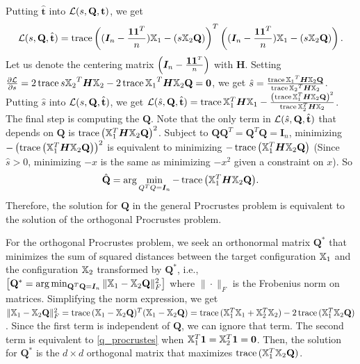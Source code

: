 \documentclass[12pt,oneside,final]{thesis}
\begin{document}
Putting $\hat{\mathbf{t}}$ into  $\mathcal{L}(s,\mathbf{Q},{\mathbf{t}})$, we get 
\[\mathcal{L}(s,\mathbf{Q},\hat{\mathbf{t}}) = \operatorname{trace} \left((\bm{I}_n- \frac{\mbox{{\bf 1}} {\ensuremath{\mbox{{\bf 1}}}} ^T}{n}){\mathbb{X}}_1 - (s{\mathbb{X}}_2\mathbf{Q} )\right)^T \left((\bm{I}_n- \frac{\mbox{{\bf 1}} {\ensuremath{\mbox{{\bf 1}}}} ^T}{n}){\mathbb{X}}_1 - (s{\mathbb{X}}_2\mathbf{Q})\right).\]
Let us denote the centering matrix $\left(\bm{I}_n- \frac{\mbox{{\bf 1}} {\ensuremath{\mbox{{\bf 1}}}} ^T}{n}\right)$  with $\bm{H}$. 
Setting  $\frac{\partial \mathcal{L}}{\partial s}=2 \operatorname{trace} {s{{\mathbb{X}}_2}^T  \bm{H} {{\mathbb{X}}_2}}-2 \operatorname{trace} {  {{\mathbb{X}}_1}^T \bm{H} {\mathbb{X}}_2\mathbf{Q}}=\bm{0}$,
we get $\hat{s}=\frac{ \operatorname{trace} {  {{\mathbb{X}}_1}^T \bm{H} {\mathbb{X}}_2\mathbf{Q}}}{\operatorname{trace} {{{\mathbb{X}}_2}^T  \bm{H} {{\mathbb{X}}_2}}}$.
Putting $\hat{s}$ into $\mathcal{L}(s,\mathbf{Q},\hat{\mathbf{t}})$, we get
$\mathcal{L}(\hat{s},\mathbf{Q},\hat{\mathbf{t}}) = 
\operatorname{trace}{{\mathbb{X}}_1^T \bm{H} {\mathbb{X}}_1}- 
\frac{ \left({ \operatorname{trace}{  {\mathbb{X}}_1^T \bm{H} {\mathbb{X}}_2\mathbf{Q} }}\right)^2}
{\operatorname{trace}{{\mathbb{X}}_2^T \bm{H} {\mathbb{X}}_2}} $.
The final step is computing the $\mathbf{Q}$. 
Note that the only term in $\mathcal{L}(\hat{s},\mathbf{Q},\hat{\mathbf{t}})$  that depends on $\mathbf{Q}$ is  $\operatorname{trace} \left( {\mathbb{X}}_1^T \bm{H} {\mathbb{X}}_2\mathbf{Q}\right)^2$. 
Subject to $\mathbf{Q}\mathbf{Q}^T=\mathbf{Q}^T\mathbf{Q}=\bm{I}_n$, minimizing   $- \left( \operatorname{trace} \left( {\mathbb{X}}_1^T \bm{H} {\mathbb{X}}_2\mathbf{Q}\right)\right)^2$ is equivalent to minimizing  $-\operatorname{trace} \left( {\mathbb{X}}_1^T \bm{H} {\mathbb{X}}_2\mathbf{Q}\right)$ (Since $\hat{s}>0$, minimizing $-x$ is the same as minimizing $-x^2$ given a constraint on $x$). So  \[\hat{\mathbf{Q}}=\arg\min_{Q^TQ = \bm{I}_n}{-\operatorname{trace} \left( {\mathbb{X}}_1^T \bm{H} {\mathbb{X}}_2\mathbf{Q}\right)}. \label{q_procrustes}\] Therefore, the solution for $\mathbf{Q}$ in the general Procrustes problem is equivalent to the solution of the orthogonal Procrustes problem.

For the orthogonal Procrustes problem, we seek  an orthonormal matrix $\mathbf{Q}^*$ that minimizes the sum of squared distances between the  target configuration ${\mathbb{X}}_1$ and  the configuration ${\mathbb{X}}_2$ transformed by $\mathbf{Q}^*$, i.e.,
 $\left[\mathbf{Q}^* = \arg\min_{\mathbf{Q}^T\mathbf{Q} = \bm{I}_n} \|{\mathbb{X}}_1 - {\mathbb{X}}_2\mathbf{Q}\|_F^2  \right] $
 where $\|\cdot\|_F$ is the Frobenius norm on matrices.
Simplifying the norm expression, we get $\|{\mathbb{X}}_1 - {\mathbb{X}}_2\mathbf{Q}\|_F^2 = \operatorname{trace} {({\mathbb{X}}_1 - {\mathbb{X}}_2\mathbf{Q})^T({\mathbb{X}}_1 - {\mathbb{X}}_2\mathbf{Q})}= \operatorname{trace} {({\mathbb{X}}_1^T{\mathbb{X}}_1 + {\mathbb{X}}_2^T{\mathbb{X}}_2)} - 2\operatorname{trace}{ ({\mathbb{X}}_1^T {\mathbb{X}}_2\mathbf{Q})}$. Since the first term is independent of $\mathbf{Q}$, we can ignore that term. The second term  is equivalent to \eqref{q_procrustes} when  ${\mathbb{X}}_1^T\mbox{{\bf 1}} =  {\mathbb{X}}_2^T\mbox{{\bf 1}}=\bm{0}$. Then, the solution for $\mathbf{Q}^*$ is the  $d\times d$ orthogonal matrix that maximizes $\operatorname{trace}{ ({\mathbb{X}}_1^T {\mathbb{X}}_2\mathbf{Q})}$.
\end{document}
